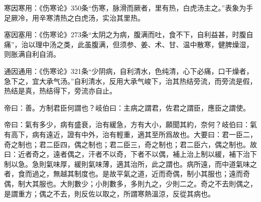 \documentclass[draft,12pt]{ctexbook}
\begin{document}
寒因寒用：《伤寒论》350条“伤寒，脉滑而厥者，里有热，白虎汤主之。”表象为手足厥冷，用辛寒清热之白虎汤，实治其里热。

塞因塞用：《伤寒论》273条“太阴之为病，腹满而吐，食不下，自利益甚，时腹自痛”，治以理中汤之类，此虽腹满，但须参、姜、术、甘、温中散寒，健脾燥湿，则胀满自利自消。

通因通用：《伤寒论》321条“少阴病，自利清水，色纯清，心下必痛，口干燥者，急下之，宜大承气汤。”自利清水，反用大承气峻下，治其热结旁流，而旁流是假，热结是真，热结得下，旁流亦自止。


\begin{yuanwen}
帝曰：善。方制君臣何謂也？岐伯曰：主病之謂君，佐君之謂臣，應臣之謂使。

帝曰：氣有多少，病有盛衰，治有緩急，方有大小，願聞其約，奈何？岐伯曰：氣有高下，病有遠近，證有中外，治有輕重，適其至所爲故也。大要曰：君一臣二，奇之制也；君二臣四，偶之制也；君二臣三，奇之制也；君二臣六，偶之制也。故曰：近者奇之，遠者偶之，汗者不以奇，下者不以偶，補上治上制以緩，補下治下制以急。急則氣味厚，緩則氣味薄，適其治所，此之謂也。病所遠，而中道氣味之者，食而過之，無越其制度也。是故平氣之道，近而奇偶，制小其服也；遠而奇偶，制大其服也。大則數少；小則數多，多則九之，少則二之。奇之不去則偶之，是謂重方；偶之不去，則反佐以取之，所謂寒熱溫涼，反從其病也。
\end{yuanwen}

\end{document}

